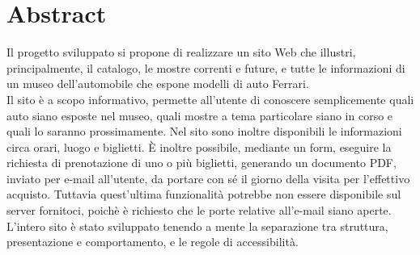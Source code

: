 \section{Abstract}
Il progetto sviluppato si propone di realizzare un sito Web che illustri, principalmente, il catalogo, le mostre correnti e future, e tutte le informazioni di un museo dell'automobile che espone modelli di auto Ferrari.\\
Il sito è a scopo informativo, permette all'utente di conoscere semplicemente quali auto siano esposte nel museo, quali mostre a tema particolare siano in corso e quali lo saranno prossimamente. Nel sito sono inoltre disponibili le informazioni circa orari, luogo e biglietti. È inoltre possibile, mediante un form, eseguire la richiesta di prenotazione di uno o più biglietti, generando un documento PDF, inviato per e-mail all'utente, da portare con sé il giorno della visita per l'effettivo acquisto. Tuttavia quest'ultima funzionalità potrebbe non essere disponibile sul server fornitoci, poichè è richiesto che le porte relative all'e-mail siano aperte.\\
L'intero sito è stato sviluppato tenendo a mente la separazione tra struttura, presentazione e comportamento, e le regole di accessibilità.
